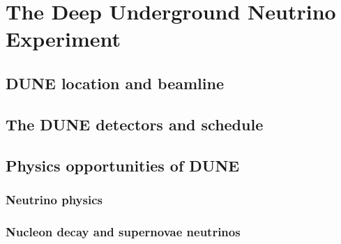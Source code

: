 \chapter{The Deep Underground Neutrino Experiment}  %

\graphicspath{{DUNE/Figs/PDF/}{DUNE/Figs/Raster/}{DUNE/Figs/Vector}}


\section{DUNE location and beamline} %

\section{The DUNE detectors and schedule} \label{sec:DUNEDetector} %

\section{Physics opportunities of DUNE} %

\subsection{Neutrino physics}  %

\subsection{Nucleon decay and supernovae neutrinos}  %

